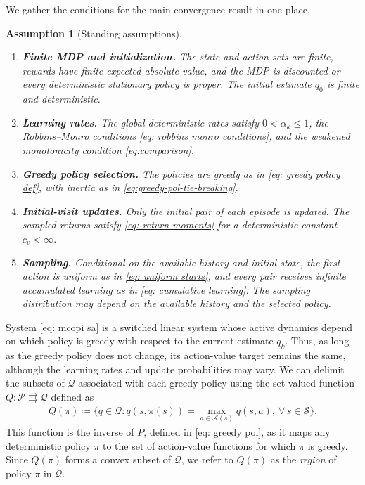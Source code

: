 \documentclass[twoside,11pt]{article}
\newtheorem{assumption}[assumption]{Assumption}
\newcommand{\qset}{\mathcal{Q}}
\newcommand{\aset}{\mathcal{A}}
\newcommand{\sset}{\mathcal{S}}
\newcommand{\polset}{\mathcal{P}}
\newcommand{\pol}{\pi}
\newcommand{\graval}{Q}
\DeclareRobustCommand{\reviewbarstart}{%
  \ifhmode %
    \vadjust{\vbox to 0pt{%
      \vskip-\ht\strutbox %
      \vskip-\dp\strutbox %
      \cbstart[\changebarwidth] %
      \vss %
    }}%
  \else %
    \cbstart[\changebarwidth]%
  \fi %
} %
\providecommand{\DIFadd}[1]{#1} %
\providecommand{\DIFaddbegin}{\reviewbarstart} %
\providecommand{\DIFaddend}{\protect\cbend} %
\def\DIFadd#1{#1}%
\def\DIFaddbegin{}%
\def\DIFaddend{}%
\begin{document}
\DIFadd{We gather the conditions for the main convergence result in one place}\DIFaddend .

\begin{assumption}[Standing assumptions]
\label{asp: standing}
\phantom{Assume}
\begin{enumerate}[label=(\arabic*)]
             \item \textbf{ \DIFaddbegin \DIFadd{Finite MDP and initialization}\DIFaddend .} The  \DIFaddbegin \DIFadd{state and action sets are finite, rewards have finite expected absolute value, and the MDP is discounted or every deterministic stationary policy is proper. The initial estimate $q_0$ is finite and deterministic.
}\DIFaddend \item \DIFaddbegin \DIFadd{\textbf{Learning rates.} The global deterministic rates satisfy $0<\alpha_k\le1$, the Robbins--Monro conditions \eqref{eq: robbins monro conditions}, and the weakened monotonicity condition \eqref{eq:comparison}.
}\item \DIFaddend \textbf{ \DIFaddbegin \DIFadd{Greedy policy selection}\DIFaddend .} The  \DIFaddbegin \DIFadd{policies are greedy as in \eqref{eq: greedy policy def}, with inertia as in \eqref{eq:greedy-pol-tie-breaking}.
}\DIFaddend \item \textbf{ \DIFaddbegin \DIFadd{Initial-visit updates}\DIFaddend . \DIFaddbegin } \DIFadd{Only the initial pair of each episode is updated. The sampled returns satisfy \eqref{eq: return moments} for a deterministic constant $c_v<\infty$.
}\item \DIFadd{\textbf{Sampling.} Conditional on the available history and initial state, the first action is uniform as in \eqref{eq: uniform starts}, and every pair receives infinite accumulated learning as in \eqref{eq: cumulative learning}. The sampling distribution may depend on the available history and the selected policy.
}\DIFaddend \end{enumerate}
\end{assumption}

 System \eqref{eq: mcopi sa} is a switched linear system whose active dynamics depend on which policy is greedy with respect to the current estimate $q_k$.
Thus, as long as the greedy policy does not change,  \DIFaddbegin \DIFadd{its action-value target remains the same, although the learning rates and update probabilities may vary.
}\DIFaddend We can delimit the  \DIFaddbegin \DIFadd{subsets }\DIFaddend of $\qset$  \DIFaddbegin \DIFadd{associated with each greedy policy }\DIFaddend using the set-valued function $\graval : \polset \rightrightarrows \qset$ defined as
\begin{align}
\label{eq: greedy action values}
    \graval(\pol) \coloneqq \big\{ q \in \qset : q(s, \pol(s)) = \max_{a \in \aset(s)} q(s,a), \ \forall \, s \in \sset \big\} .
\end{align}
This function is the inverse of $P$, defined in \eqref{eq: greedy pol}, as it maps any deterministic policy $\pol$ to the set of action-value functions for which $\pol$ is greedy.
Since $\graval(\pol)$ forms a convex subset of $\qset$, we refer to $\graval(\pol)$ as the \textit{region} of policy $\pol$ in $\qset$.
\end{document}
